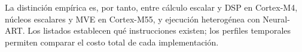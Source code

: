 \noindent\begin{minipage}{\linewidth}

\end{minipage}

La distinción empírica es, por tanto, entre cálculo escalar y DSP en Cortex-M4, núcleos escalares y MVE en Cortex-M55, y ejecución heterogénea con Neural-ART. Los listados establecen qué instrucciones existen; los perfiles temporales permiten comparar el costo total de cada implementación.

\FloatBarrier
\clearpage
